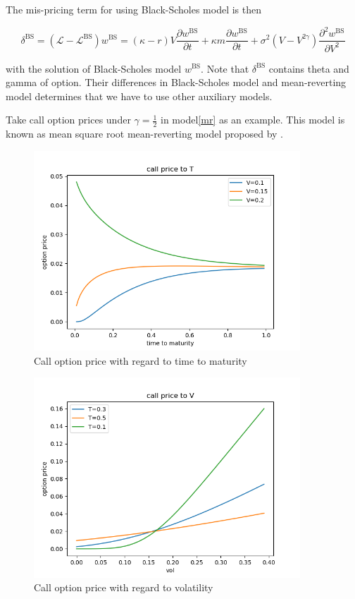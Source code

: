 \noindent The mis-pricing term for using Black-Scholes model is then

$$\delta^{\text{BS}} = (\mathcal{L} - \mathcal{L}^{\text{BS}}) w^{\text{BS}} = (\kappa - r)V \frac{\partial w^{\text{BS}}}{\partial t} + \kappa m \frac{\partial w^{\text{BS}}}{\partial t} + \sigma^{2} (V - V^{2 \gamma}) \frac{\partial^{2} w^{\text{BS}}}{\partial V^{2}} $$

\noindent with the solution of Black-Scholes model $w^{\text{BS}}$. Note that $\delta^{\text{BS}}$ contains theta and gamma of option. Their differences in Black-Scholes model and mean-reverting model determines that we have to use other auxiliary models.

Take call option prices under $\gamma=\frac{1}{2}$ in model\eqref{mr} as an example. This model is known as mean square root mean-reverting model proposed by \cite{grunbichler_valuing_1996}.


\begin{figure}[ht]
    \centering
    \includegraphics[width=10cm]{./figures/call2T.png}
    \caption{Call option price with regard to time to maturity}\label{call2t}
\end{figure}

\begin{figure}[ht]
    \centering
    \includegraphics[width=10cm]{./figures/call2V.png}
    \caption{Call option price with regard to volatility}\label{call2v}
\end{figure}

